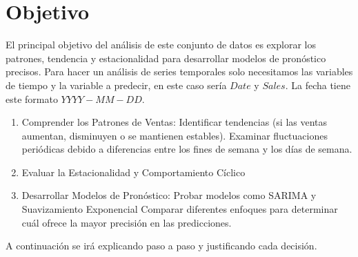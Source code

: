 

\clearpage
\section{Objetivo}

El principal objetivo del análisis de este conjunto de datos es explorar los patrones, tendencia y estacionalidad para desarrollar modelos de pronóstico precisos. Para hacer un análisis de series temporales solo necesitamos las variables de tiempo y la variable a predecir, en este caso sería $Date$ y $Sales$. La fecha tiene este formato $YYYY-MM-DD$.

\begin{enumerate}
	\item Comprender los Patrones de Ventas:
	Identificar tendencias (si las ventas aumentan, disminuyen o se mantienen estables).
	Examinar fluctuaciones periódicas debido a diferencias entre los fines de semana y los días de semana.
	\item Evaluar la Estacionalidad y Comportamiento Cíclico
	\item Desarrollar Modelos de Pronóstico:
	Probar modelos como SARIMA y Suavizamiento Exponencial
	Comparar diferentes enfoques para determinar cuál ofrece la mayor precisión en las predicciones.
\end{enumerate}



A continuación se irá explicando paso a paso y justificando cada decisión.